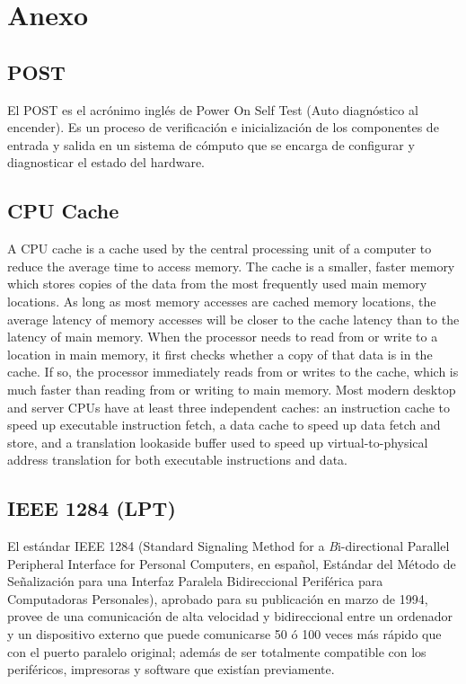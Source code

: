 \documentclass[12pt,oneside,a4paper]{article}
\begin{document}
\appendix

\section{Anexo}\label{sec:anexo}
	\subsection{POST}\label{sub:post}
	
		El POST es el acrónimo inglés de Power On Self Test (Auto diagnóstico
		al encender). Es un proceso de verificación e inicialización de los
		componentes de entrada y salida en un sistema de cómputo que se encarga
		de configurar y diagnosticar el estado del hardware.

	\subsection{CPU Cache}\label{sub:cpu cache}
	
		A CPU cache is a cache used by the central processing unit of a
		computer to reduce the average time to access memory. The cache is a
		smaller, faster memory which stores copies of the data from the most
		frequently used main memory locations. As long as most memory accesses
		are cached memory locations, the average latency of memory accesses
		will be closer to the cache latency than to the latency of main memory.
		When the processor needs to read from or write to a location in main
		memory, it first checks whether a copy of that data is in the cache. If
		so, the processor immediately reads from or writes to the cache, which
		is much faster than reading from or writing to main memory.  Most
		modern desktop and server CPUs have at least three independent caches:
		an instruction cache to speed up executable instruction fetch, a data
		cache to speed up data fetch and store, and a translation lookaside
		buffer used to speed up virtual-to-physical address translation for
		both executable instructions and data.



	\subsection{IEEE 1284 (LPT)}\label{sub:ieee 1284 (lpt)}
		
		El estándar IEEE 1284 (Standard Signaling Method for a {\emph Bi-directional
		Parallel Peripheral Interface for Personal Computers}, en español,
		Estándar del Método de Señalización para una Interfaz Paralela
		Bidireccional Periférica para Computadoras Personales), aprobado para
		su publicación en marzo de 1994, provee de una comunicación de alta
		velocidad y bidireccional entre un ordenador y un dispositivo externo
		que puede comunicarse 50 ó 100 veces más rápido que con el puerto
		paralelo original; además de ser totalmente compatible con los
		periféricos, impresoras y software que existían previamente.
\end{document}
